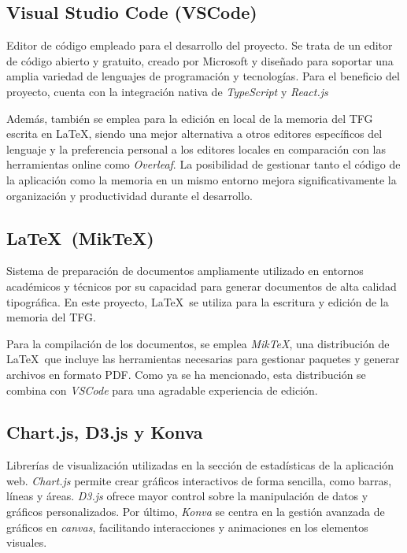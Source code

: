 \subsection{Visual Studio Code (VSCode)}
Editor de código empleado para el desarrollo del proyecto. Se trata de un editor de código abierto y gratuito, creado por Microsoft y diseñado para soportar una amplia variedad de lenguajes de programación y tecnologías. Para el beneficio del proyecto, cuenta con la integración nativa de \textit{TypeScript} y \textit{React.js}

Además, también se emplea para la edición en local de la memoria del TFG escrita en \LaTeX, siendo una mejor alternativa a otros editores específicos del lenguaje y la preferencia personal a los editores locales en comparación con las herramientas online como \textit{Overleaf}. La posibilidad de gestionar tanto el código de la aplicación como la memoria en un mismo entorno mejora significativamente la organización y productividad durante el desarrollo.

\subsection{\LaTeX\ (MikTeX)}
Sistema de preparación de documentos ampliamente utilizado en entornos académicos y técnicos por su capacidad para generar documentos de alta calidad tipográfica. En este proyecto, \LaTeX\ se utiliza para la escritura y edición de la memoria del TFG.

Para la compilación de los documentos, se emplea \textit{MikTeX}, una distribución de \LaTeX\ que incluye las herramientas necesarias para gestionar paquetes y generar archivos en formato PDF. Como ya se ha mencionado, esta distribución se combina con \textit{VSCode} para una agradable experiencia de edición.

\subsection{Chart.js, D3.js y Konva}
Librerías de visualización utilizadas en la sección de estadísticas de la aplicación web. \textit{Chart.js} permite crear gráficos interactivos de forma sencilla, como barras, líneas y áreas. \textit{D3.js} ofrece mayor control sobre la manipulación de datos y gráficos personalizados. Por último, \textit{Konva} se centra en la gestión avanzada de gráficos en \textit{canvas}, facilitando interacciones y animaciones en los elementos visuales.

